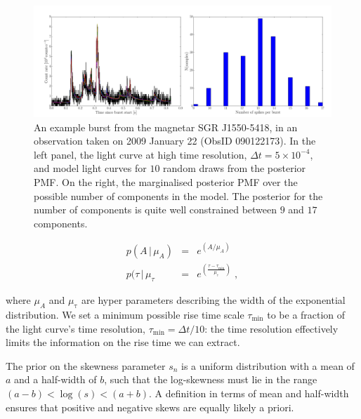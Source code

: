 \documentclass[12pt]{emulateapj}
\newcommand{\given}{\,|\,}
\begin{document}

\begin{figure}[htbp]
\includegraphics[width=\textwidth]{example_dnest_result.pdf}
\caption{An example burst from the magnetar SGR J1550-5418, in an observation taken on 2009 January 22 (ObsID 090122173). In the left
panel, the light curve at high time resolution, $\Delta t = 5 \times 10^{-4}$, and model light curves for $10$ random draws from the posterior PMF. 
On the right, the marginalised posterior PMF over the possible number of components in the model. The posterior for the number of components is 
quite well constrained between $9$ and $17$ components.}
\label{fig:dnest_example}
\end{figure}


\begin{eqnarray}
p(A \given \mu_A) &=& e^{(A/\mu_A)} \\
p(\tau \given \mu_{\tau} & = & e^{(\frac{\tau - \tau_{\mathrm{min}}}{\mu_{\mathrm{\tau}}})} \; ,
\end{eqnarray}

where $\mu_A$ and $\mu_{\mathrm{\tau}}$ are hyper parameters describing the width of the exponential distribution.
We set a minimum possible rise time scale $\tau_{\mathrm{min}}$ to be a fraction of the light curve's time resolution,
$\tau_{\mathrm{min}} = \Delta t/10$: the time resolution effectively limits the information on the rise time we can extract.

The prior on the skewness parameter $s_n$ is a uniform distribution with a mean of $a$ and a half-width of $b$, such
that the log-skewness must lie in the range $(a-b) < \log{(s)} < (a+b)$. A definition in terms of mean and half-width ensures
that positive and negative skews are equally likely a priori.
\end{document}

